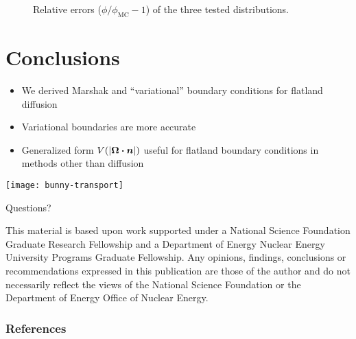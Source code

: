 \documentclass{beamer}
\begin{document}
\begin{frame}
\begin{figure}[tb]
  \centering
  \hspace{-.5in}
  
  \hspace{-.5in}
  \caption{Relative errors ($\phi/\phi_\text{MC} - 1$) of the three tested
  distributions.}
  \label{fig:relative}
\end{figure}
\end{frame}

\section{Conclusions}
\begin{frame}
  \begin{itemize}
    \item We derived Marshak and ``variational'' boundary conditions for
      flatland diffusion
    \item Variational boundaries are more accurate
    \item Generalized form $V(\left| \bm{\Omega}\bm{\cdot}\bm{n} \right|)$ useful for flatland
      boundary conditions in methods other than diffusion
  \end{itemize}
\end{frame}

\begin{frame}

{\par\centering\hspace{-.35in}
  \texttt{[image: bunny-transport]}
  \par}

\vspace{-2.75in}
{\par\centering\Huge Questions?
\par}%
\vspace{2.5in}

{\setlength{\baselineskip}{-\baselineskip} \tiny  \raggedright
This material is based upon work supported under a National Science Foundation
Graduate Research Fellowship and a Department of Energy Nuclear Energy
University Programs Graduate Fellowship. Any opinions, findings, conclusions or
recommendations expressed in this publication are those of the author and do
not necessarily reflect the views of the National Science Foundation or the
Department of Energy Office of Nuclear Energy.\par}
\end{frame}

\appendix
\begin{frame}
  \frametitle{References}


\end{frame}
\end{document}

